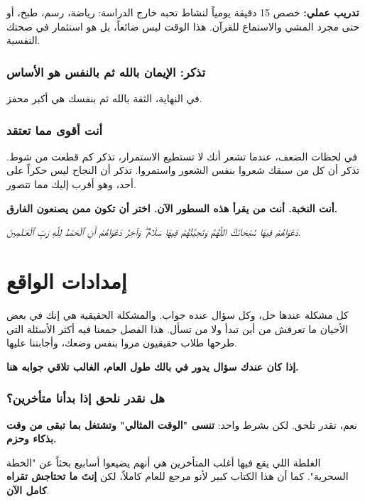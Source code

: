 \documentclass[12pt,a4paper]{book}
\newcommand{\quoteAr}[1]{%
	\begin{myquote}
		\itshape #1
	\end{myquote}
}
\newcommand{\importantAr}[1]{%
	\begin{important}
		\bfseries #1
	\end{important}
}
\newcommand{\exerciseAr}[1]{%
	\begin{exercise}
		\textbf{تدريب عملي:} #1
	\end{exercise}
}
\begin{document}
	\exerciseAr{
		خصص 15 دقيقة يومياً لنشاط تحبه خارج الدراسة: رياضة، رسم، طبخ، أو حتى مجرد المشي والاستماع للقرآن. هذا الوقت ليس ضائعاً، بل هو استثمار في صحتك النفسية.
	}
	
	\subsection{تذكر: الإيمان بالله ثم بالنفس هو الأساس}
	في النهاية، الثقة بالله ثم بنفسك هي أكبر محفز.
	
	\subsection{ أنت أقوى مما تعتقد}
	
	في لحظات الضعف، عندما تشعر أنك لا تستطيع الاستمرار، تذكر كم قطعت من شوط. تذكر أن كل من سبقك شعروا بنفس الشعور واستمروا. تذكر أن النجاح ليس حكراً على أحد، وهو أقرب إليك مما تتصور.
	
	\importantAr{أنت النخبة. أنت من يقرأ هذه السطور الآن. اختر أن تكون ممن يصنعون الفارق.}
	
	\quoteAr{دَعْوَاهُمْ فِيهَا سُبْحَانَكَ اللَّهُمَّ وَتَحِيَّتُهُمْ فِيهَا سَلَامٌ ۖ وَآخِرُ دَعْوَاهُمْ أَنِ ٱلْحَمْدُ لِلَّهِ رَبِّ ٱلْعَـٰلَمِينَ.}
	
	
	
	
	
	\chapter{إمدادات الواقع}
	\label{chap:questions}
	
	كل مشكلة عندها حل، وكل سؤال عنده جواب. والمشكلة الحقيقية هي إنك في بعض الأحيان ما تعرفش من أين تبدأ ولا من تسأل. هذا الفصل جمعنا فيه أكثر الأسئلة التي طرحها طلاب حقيقيون مروا بنفس وضعك، وأجابتنا عليها.
	
	\importantAr{إذا كان عندك سؤال يدور في بالك طول العام، الغالب تلاقي جوابه هنا.}
	
	
	
	
	\subsection*{هل نقدر نلحق إذا بدأنا متأخرين؟}
	
	نعم، تقدر تلحق. لكن بشرط واحد: \textbf{تنسى "الوقت المثالي" وتشتغل بما تبقى من وقت بذكاء وحزم.}
	
	الغلطة اللي يقع فيها أغلب المتأخرين هي أنهم يضيعوا أسابيع بحثاً عن "الخطة السحرية". كما أن هذا الكتاب كبير لأنو مرجع للعام كاملاً، لكن \textbf{إنتَ ما تحتاجش تقراه كامل الآن}.
	
\end{document}

